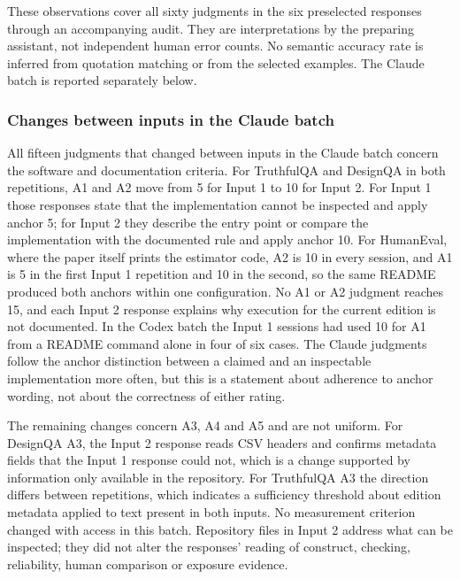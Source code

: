 \documentclass[10pt,conference]{IEEEtran}
\begin{document}
These observations cover all sixty judgments in the six preselected responses through an accompanying audit. They are interpretations by the preparing assistant, not independent human error counts. No semantic accuracy rate is inferred from quotation matching or from the selected examples. The Claude batch is reported separately below.
\subsubsection{Changes between inputs in the Claude batch}
All fifteen judgments that changed between inputs in the Claude batch concern the software and documentation criteria. For TruthfulQA and DesignQA in both repetitions, A1 and A2 move from 5 for Input 1 to 10 for Input 2. For Input 1 those responses state that the implementation cannot be inspected and apply anchor 5; for Input 2 they describe the entry point or compare the implementation with the documented rule and apply anchor 10. For HumanEval, where the paper itself prints the estimator code, A2 is 10 in every session, and A1 is 5 in the first Input 1 repetition and 10 in the second, so the same README produced both anchors within one configuration. No A1 or A2 judgment reaches 15, and each Input 2 response explains why execution for the current edition is not documented. In the Codex batch the Input 1 sessions had used 10 for A1 from a README command alone in four of six cases. The Claude judgments follow the anchor distinction between a claimed and an inspectable implementation more often, but this is a statement about adherence to anchor wording, not about the correctness of either rating.

The remaining changes concern A3, A4 and A5 and are not uniform. For DesignQA A3, the Input 2 response reads CSV headers and confirms metadata fields that the Input 1 response could not, which is a change supported by information only available in the repository. For TruthfulQA A3 the direction differs between repetitions, which indicates a sufficiency threshold about edition metadata applied to text present in both inputs. No measurement criterion changed with access in this batch. Repository files in Input 2 address what can be inspected; they did not alter the responses' reading of construct, checking, reliability, human comparison or exposure evidence.
\end{document}
